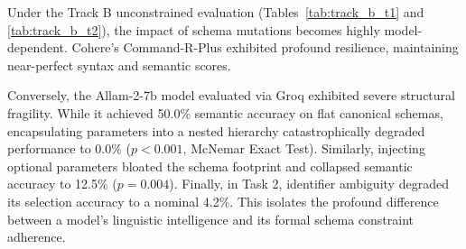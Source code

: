 \documentclass[10pt,conference]{IEEEtran}
\begin{document}
\begin{table}[h]
\centering
\caption{Track B - Task 1 Semantics Execution Rate by Model}
\label{tab:track_b_t1}
\end{table}

\begin{table}[h]
\centering
\caption{Track B - Task 2 Top-1 Selection Accuracy by Model}
\label{tab:track_b_t2}
\end{table}

Under the Track B unconstrained evaluation (Tables~\ref{tab:track_b_t1} and \ref{tab:track_b_t2}), the impact of schema mutations becomes highly model-dependent. Cohere's Command-R-Plus exhibited profound resilience, maintaining near-perfect syntax and semantic scores. 

Conversely, the Allam-2-7b model evaluated via Groq exhibited severe structural fragility. While it achieved 50.0\% semantic accuracy on flat canonical schemas, encapsulating parameters into a nested hierarchy catastrophically degraded performance to 0.0\% ($p < 0.001$, McNemar Exact Test). Similarly, injecting optional parameters bloated the schema footprint and collapsed semantic accuracy to 12.5\% ($p = 0.004$). Finally, in Task 2, identifier ambiguity degraded its selection accuracy to a nominal 4.2\%. This isolates the profound difference between a model's linguistic intelligence and its formal schema constraint adherence.
\end{document}
